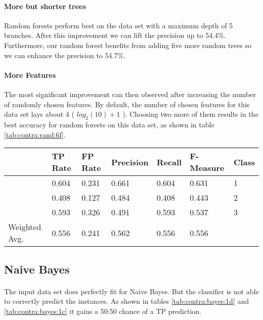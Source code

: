 \documentclass[paper=a4, fontsize=11pt]{scrartcl} %
\numberwithin{equation}{section} %
\numberwithin{figure}{section} %
\numberwithin{table}{section} %
\begin{document}
\paragraph{More but shorter trees}
Random forests perform best on the data set with a maximum depth of 5 branches. After this improvement we can lift the precision up to 54.4\%. Furthermore, our random forest benefits from adding five more random trees so we can enhance the precision to  54.7\%.
\paragraph{More Features}
The most significant improvement can then observed after increasing the number of randomly chosen features. By default, the number of chosen features for this data set lays about 4 ( $ log_2(10) + 1 $ ). Choosing two more of them results in the best accuracy for random forests on this data set, as shown in table \ref{tab:contra:rand:6f}.

\begin{table*}[htb]\centering
  \begin{tabular*}{\columnwidth}{@{}lllllll@{}}
      \toprule 
               &  TP Rate & FP Rate & Precision & Recall & F-Measure &  Class \\  \midrule     
               &  0.604   & 0.231   & 0.661     & 0.604  & 0.631     &  1     \\  
               &  0.408   & 0.127   & 0.484     & 0.408  & 0.443     &  2     \\  
               &  0.593   & 0.326   & 0.491     & 0.593  & 0.537     &  3     \\  
Weighted Avg.  &  0.556   & 0.241   & 0.562     & 0.556  & 0.556     &        \\  \bottomrule 
    \end{tabular*}
\caption{Random Forests on Contraceptive Data Set -- with at least 6 chosen features} 
\label{tab:contra:rand:6f}
\end{table*}
\FloatBarrier


\subsection{Naive Bayes}

\paragraph{}The input data set does perfectly fit for Naive Bayes. But the classifier is not able to correctly predict the instances. As shown in tables \ref{tab:contra:bayes:1d} and \ref{tab:contra:bayes:1c} it gains a 50:50 chance of a TP prediction.
\end{document}
